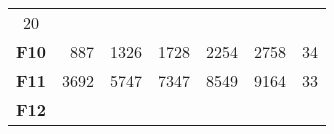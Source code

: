 \documentclass[12pt,a4paper]{article}
\begin{document}
\begin{longtable}[c]{@{}crrrrrr@{}}
\begin{minipage}[t]{0.07\columnwidth}
20
\strut\end{minipage}\tabularnewline
\begin{minipage}[t]{0.11\columnwidth}\centering\strut
\textbf{F10}
\strut\end{minipage} &
\begin{minipage}[t]{0.08\columnwidth}\raggedleft\strut
887
\strut\end{minipage} &
\begin{minipage}[t]{0.08\columnwidth}\raggedleft\strut
1326
\strut\end{minipage} &
\begin{minipage}[t]{0.09\columnwidth}\raggedleft\strut
1728
\strut\end{minipage} &
\begin{minipage}[t]{0.10\columnwidth}\raggedleft\strut
2254
\strut\end{minipage} &
\begin{minipage}[t]{0.11\columnwidth}\raggedleft\strut
2758
\strut\end{minipage} &
\begin{minipage}[t]{0.07\columnwidth}\raggedleft\strut
34
\strut\end{minipage}\tabularnewline
\begin{minipage}[t]{0.11\columnwidth}\centering\strut
\textbf{F11}
\strut\end{minipage} &
\begin{minipage}[t]{0.08\columnwidth}\raggedleft\strut
3692
\strut\end{minipage} &
\begin{minipage}[t]{0.08\columnwidth}\raggedleft\strut
5747
\strut\end{minipage} &
\begin{minipage}[t]{0.09\columnwidth}\raggedleft\strut
7347
\strut\end{minipage} &
\begin{minipage}[t]{0.10\columnwidth}\raggedleft\strut
8549
\strut\end{minipage} &
\begin{minipage}[t]{0.11\columnwidth}\raggedleft\strut
9164
\strut\end{minipage} &
\begin{minipage}[t]{0.07\columnwidth}\raggedleft\strut
33
\strut\end{minipage}\tabularnewline
\begin{minipage}[t]{0.11\columnwidth}\centering\strut
\textbf{F12}
\strut\end{minipage} &
\begin{minipage}[t]{0.08\columnwidth}\raggedleft\strut

\end{minipage}
\end{longtable}
\end{document}
